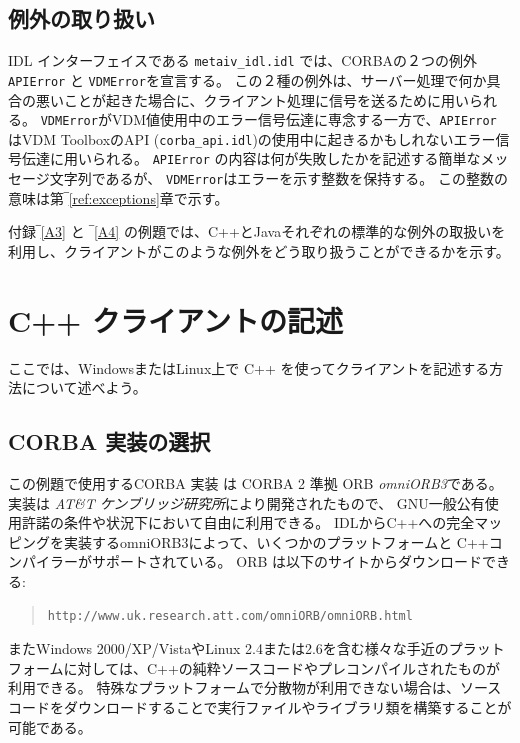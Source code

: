 \documentclass[\pformat,12pt]{jarticle}
\begin{document}
\subsection{例外の取り扱い}
\label{handlingofexceptions}

IDL インターフェイスである {\tt metaiv\_idl.idl} では、CORBAの２つの例外{\tt APIError} と {\tt VDMError}を宣言する。
この２種の例外は、サーバー処理で何か具合の悪いことが起きた場合に、クライアント処理に信号を送るために用いられる。
 {\tt VDMError}がVDM値使用中のエラー信号伝達に専念する一方で、{\tt APIError} はVDM ToolboxのAPI ({\tt  corba\_api.idl})の使用中に起きるかもしれないエラー信号伝達に用いられる。
 {\tt APIError} の内容は何が失敗したかを記述する簡単なメッセージ文字列であるが、 {\tt VDMError}はエラーを示す整数を保持する。
この整数の意味は第‾\ref{ref:exceptions}章で示す。

付録‾\ref{A3} と ‾\ref{A4} の例題では、C++とJavaそれぞれの標準的な例外の取扱いを利用し、クライアントがこのような例外をどう取り扱うことができるかを示す。

\newpage
\section{ C++ クライアントの記述}
\label{writingacppclient}

ここでは、WindowsまたはLinux上で C++ を使ってクライアントを記述する方法について述べよう。

\subsection{CORBA 実装の選択}

この例題で使用するCORBA 実装 は CORBA 2 準拠 ORB {\em omniORB3}である。
実装は {\em AT\&T ケンブリッジ研究所}により開発されたもので、 GNU一般公有使用許諾の条件や状況下において自由に利用できる。
IDLからC++への完全マッピングを実装するomniORB3によって、いくつかのプラットフォームと C++コンパイラーがサポートされている。  
ORB は以下のサイトからダウンロードできる:

\begin{quote}
\begin{verbatim}    
http://www.uk.research.att.com/omniORB/omniORB.html
\end{verbatim}
\end{quote}

またWindows 2000/XP/VistaやLinux 2.4または2.6を含む様々な手近のプラットフォームに対しては、C++の純粋ソースコードやプレコンパイルされたものが利用できる。
特殊なプラットフォームで分散物が利用できない場合は、ソースコードをダウンロードすることで実行ファイルやライブラリ類を構築することが可能である。
\end{document}
